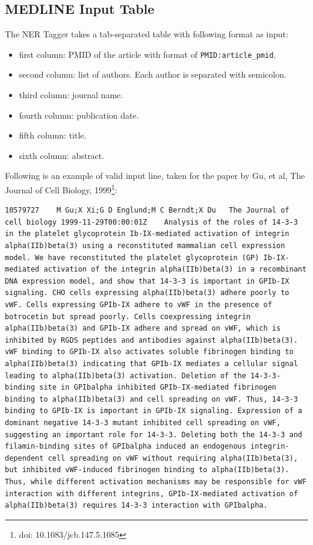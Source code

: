 \subsection{MEDLINE Input Table}

The NER Tagger takes a tab-separated table with following format as input:

\begin{itemize}
\item first column: PMID of the article with format of \texttt{PMID:article\_pmid}.
\item second column: list of authors. Each author is separated with semicolon.
\item third column: journal name.
\item fourth column: publication date.
\item fifth column: title.
\item sixth column: abstract.
\end{itemize}

Following is an example of valid input line, taken for the paper by Gu, et al, The Journal of Cell Biology, 1999\footnote{doi: 10.1083/jcb.147.5.1085}:


\begin{lstlisting}[breaklines]
10579727	M Gu;X Xi;G D Englund;M C Berndt;X Du	The Journal of cell biology	1999-11-29T00:00:01Z	Analysis of the roles of 14-3-3 in the platelet glycoprotein Ib-IX-mediated activation of integrin alpha(IIb)beta(3) using a reconstituted mammalian cell expression model.	We have reconstituted the platelet glycoprotein (GP) Ib-IX-mediated activation of the integrin alpha(IIb)beta(3) in a recombinant DNA expression model, and show that 14-3-3 is important in GPIb-IX signaling. CHO cells expressing alpha(IIb)beta(3) adhere poorly to vWF. Cells expressing GPIb-IX adhere to vWF in the presence of botrocetin but spread poorly. Cells coexpressing integrin alpha(IIb)beta(3) and GPIb-IX adhere and spread on vWF, which is inhibited by RGDS peptides and antibodies against alpha(IIb)beta(3). vWF binding to GPIb-IX also activates soluble fibrinogen binding to alpha(IIb)beta(3) indicating that GPIb-IX mediates a cellular signal leading to alpha(IIb)beta(3) activation. Deletion of the 14-3-3-binding site in GPIbalpha inhibited GPIb-IX-mediated fibrinogen binding to alpha(IIb)beta(3) and cell spreading on vWF. Thus, 14-3-3 binding to GPIb-IX is important in GPIb-IX signaling. Expression of a dominant negative 14-3-3 mutant inhibited cell spreading on vWF, suggesting an important role for 14-3-3. Deleting both the 14-3-3 and filamin-binding sites of GPIbalpha induced an endogenous integrin-dependent cell spreading on vWF without requiring alpha(IIb)beta(3), but inhibited vWF-induced fibrinogen binding to alpha(IIb)beta(3). Thus, while different activation mechanisms may be responsible for vWF interaction with different integrins, GPIb-IX-mediated activation of alpha(IIb)beta(3) requires 14-3-3 interaction with GPIbalpha.
\end{lstlisting}

